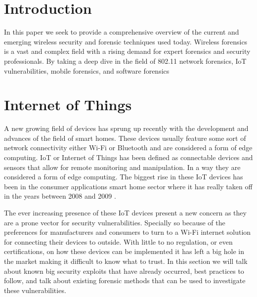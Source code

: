 \documentclass[acmlarge]{acmart}
\begin{document}


\maketitle

\section{Introduction}

In this paper we seek to provide a comprehensive overview of the current and emerging wireless security and forensic techniques used today. Wireless forensics is a vast and complex field with a rising demand for expert forensics and security professionals. By taking a deep dive in the field of 802.11 network forensics, IoT vulnerabilities, mobile forensics, and software forensics 

\section{Internet of Things}

A new growing field of devices has sprung up recently with the development and advances of the field of smart homes. These devices usually feature some sort of network connectivity either Wi-Fi or Bluetooth and are considered a form of edge computing. IoT or Internet of Things has been defined as connectable devices and sensors that allow for remote monitoring and manipulation. In a way they are considered a form of edge computing. The biggest rise in these IoT devices has been in the consumer applications smart home sector where it has really taken off in the years between 2008 and 2009 \cite{evans_iot_2011}.

The ever increasing presence of these IoT devices present a new concern as they are a prone vector for security vulnerabilities. Specially so because of the preferences for manufacturers and consumers to turn to a Wi-Fi internet solution for connecting their devices to outside. With little to no regulation, or even certifications, on how these devices can be implemented it has left a big hole in the market making it difficult to know what to trust. 
In this section we will talk about known big security exploits that have already occurred, best practices to follow, and talk about existing forensic methods that can be used to investigate these vulnerabilities.
\end{document}
